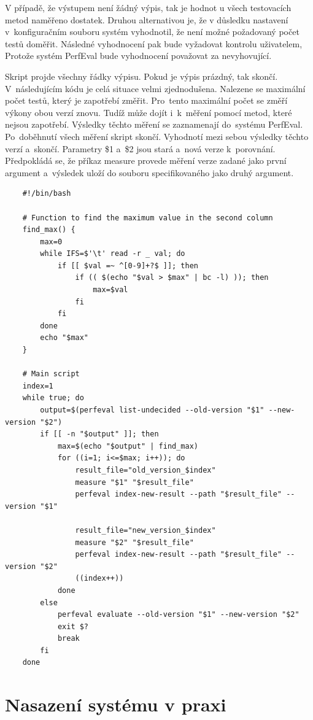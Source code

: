 V případě, že výstupem není žádný výpis, tak je hodnot u všech testovacích metod naměřeno dostatek. Druhou alternativou
je, že v důsledku nastavení v~konfiguračním souboru systém vyhodnotil, že není možné požadovaný
počet testů doměřit. Následné vyhodnocení pak bude vyžadovat kontrolu uživatelem, Protože
systém PerfEval bude vyhodnocení považovat za nevyhovující.

Skript projde všechny řádky výpisu. Pokud je výpis prázdný, tak skončí.
V~následujícím kódu je celá situace velmi zjednodušena. Nalezene se maximální počet
testů, který je zapotřebí změřit. Pro~tento maximální počet se změří výkony obou verzí znovu.
Tudíž může dojít i~k~měření pomocí metod, které nejsou zapotřebí. Výsledky těchto měření
se zaznamenají do~systému PerfEval. Po~doběhnutí všech měření skript skončí. Vyhodnotí mezi sebou výsledky těchto
verzí a~skončí. Parametry \$1 a~\$2 jsou stará a~nová verze k~porovnání. Předpokládá se, že
příkaz measure provede měření verze zadané jako první argument a~výsledek uloží do souboru specifikovaného jako druhý argument.

\begin{lstlisting}
    #!/bin/bash

    # Function to find the maximum value in the second column
    find_max() {
        max=0
        while IFS=$'\t' read -r _ val; do
            if [[ $val =~ ^[0-9]+?$ ]]; then
                if (( $(echo "$val > $max" | bc -l) )); then
                    max=$val
                fi
            fi
        done
        echo "$max"
    }

    # Main script
    index=1
    while true; do
        output=$(perfeval list-undecided --old-version "$1" --new-version "$2")
        if [[ -n "$output" ]]; then
            max=$(echo "$output" | find_max)
            for ((i=1; i<=$max; i++)); do
                result_file="old_version_$index"
                measure "$1" "$result_file"
                perfeval index-new-result --path "$result_file" --version "$1"

                result_file="new_version_$index"
                measure "$2" "$result_file"
                perfeval index-new-result --path "$result_file" --version "$2"
                ((index++))
            done
        else
            perfeval evaluate --old-version "$1" --new-version "$2"
            exit $?
            break
        fi
    done

\end{lstlisting}

\section{Nasazení systému v praxi}

